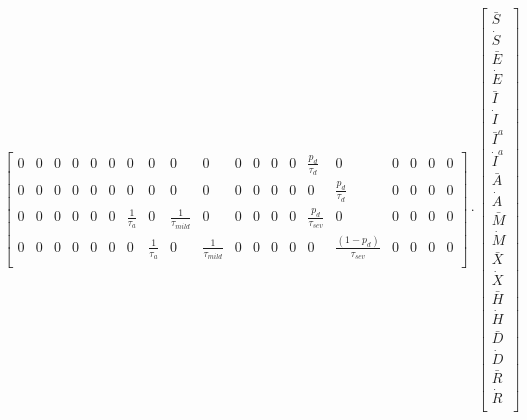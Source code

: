 \documentclass[notitlepage, superscriptaddress]{revtex4-2}
\begin{document}
\begin{eqnarray}
\begin{bmatrix}
0 & 0 & 0 & 0 & 0 & 0 & 0 & 0 & 0 & 0 & 0 & 0 & 0 & 0 & \frac{p_{d}}{\tau_{d}} & 0 & 0 & 0 & 0 & 0 \\[.1cm] 
0 & 0 & 0 & 0 & 0 & 0 & 0 & 0 & 0 & 0 & 0 & 0 & 0 & 0 & 0 & \frac{p_{d}}{\tau_{d}} & 0 & 0 & 0 & 0 \\[.1cm]
0 & 0 & 0 & 0 & 0 & 0 & \frac{1}{\tau_{a}} & 0 & \frac{1}{\tau_{mild}} & 0 & 0 & 0 & 0 & 0 & \frac{p_{d}}{\tau_{sev}} & 0 & 0 & 0 & 0 & 0 \\[.1cm]
0 & 0 & 0 & 0 & 0 & 0 & 0 & \frac{1}{\tau_{a}} & 0 & \frac{1}{\tau_{mild}} & 0 & 0 & 0 & 0 & 0 & \frac{(1-p_{d})}{\tau_{sev}} & 0 & 0 & 0 & 0 \nonumber \\[.1cm]
\end{bmatrix}
%
\cdot
\begin{bmatrix}
\bar{S} \\[.1cm]
\dot{S} \\[.1cm]
\bar{E} \\[.1cm]
\dot{E} \\[.1cm]
\bar{I} \\[.1cm]
\dot{I} \\[.1cm]
\bar{I}^{a} \\[.1cm]
\dot{I}^{a} \\[.1cm]
\bar{A} \\[.1cm]
\dot{A} \\[.1cm]
\bar{M} \\[.1cm]
\dot{M} \\[.1cm]
\bar{X} \\[.1cm]
\dot{X} \\[.1cm]
\bar{H} \\[.1cm]
\dot{H} \\[.1cm]
\bar{D} \\[.1cm]
\dot{D} \\[.1cm]
\bar{R} \\[.1cm]
\dot{R} \\[.1cm]

\end{bmatrix}
\end{eqnarray}
\end{document}
